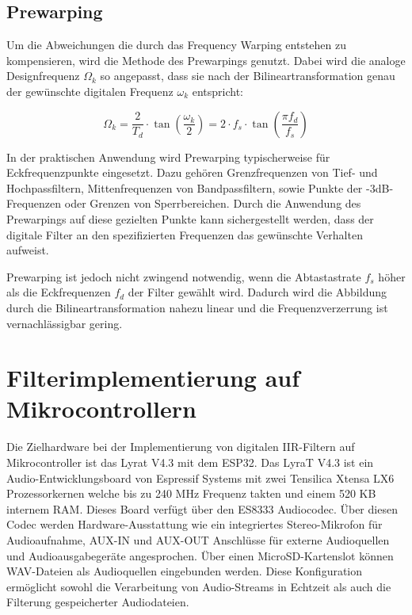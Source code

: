 \documentclass[
  ngerman,
  letterpaper,
  DIV=11]{scrreprt}
\begin{document}
\section{Prewarping}\label{prewarping}

Um die Abweichungen die durch das Frequency Warping entstehen zu
kompensieren, wird die Methode des Prewarpings genutzt. Dabei wird die
analoge Designfrequenz \(\Omega_k\) so angepasst, dass sie nach der
Bilineartransformation genau der gewünschte digitalen Frequenz
\(\omega_k\) entspricht:

\[
\Omega_k = \frac{2}{T_d} \cdot \tan\left( \frac{\omega_k}{2} \right) = 2 \cdot f_s \cdot \tan(\frac{\pi f_d}{f_s})
\]

In der praktischen Anwendung wird Prewarping typischerweise für
Eckfrequenzpunkte eingesetzt. Dazu gehören Grenzfrequenzen von Tief- und
Hochpassfiltern, Mittenfrequenzen von Bandpassfiltern, sowie Punkte der
-3dB-Frequenzen oder Grenzen von Sperrbereichen. Durch die Anwendung des
Prewarpings auf diese gezielten Punkte kann sichergestellt werden, dass
der digitale Filter an den spezifizierten Frequenzen das gewünschte
Verhalten aufweist.

Prewarping ist jedoch nicht zwingend notwendig, wenn die Abtastastrate
\(f_s\) höher als die Eckfrequenzen \(f_d\) der Filter gewählt wird.
Dadurch wird die Abbildung durch die Bilineartransformation nahezu
linear und die Frequenzverzerrung ist vernachlässigbar gering.

\chapter{Filterimplementierung auf
Mikrocontrollern}\label{filterimplementierung-auf-mikrocontrollern}

Die Zielhardware bei der Implementierung von digitalen IIR-Filtern auf
Mikrocontroller ist das Lyrat V4.3 mit dem ESP32. Das LyraT V4.3 ist ein
Audio-Entwicklungsboard von Espressif Systems mit zwei Tensilica Xtensa
LX6 Prozessorkernen welche bis zu 240 MHz Frequenz takten und einem 520
KB internem RAM. Dieses Board verfügt über den ES8333 Audiocodec. Über
diesen Codec werden Hardware-Ausstattung wie ein integriertes
Stereo-Mikrofon für Audioaufnahme, AUX-IN und AUX-OUT Anschlüsse für
externe Audioquellen und Audioausgabegeräte angesprochen. Über einen
MicroSD-Kartenslot können WAV-Dateien als Audioquellen eingebunden
werden. Diese Konfiguration ermöglicht sowohl die Verarbeitung von
Audio-Streams in Echtzeit als auch die Filterung gespeicherter
Audiodateien.
\end{document}
